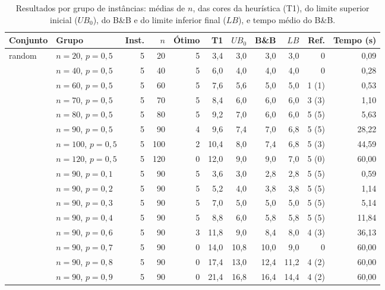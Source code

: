 \documentclass[12pt]{article}
\newcommand{\LB}{\mathit{LB}}
\newcommand{\UB}{\mathit{UB}}
\begin{document}
\begin{table}[ht]
  \centering
  \caption{Resultados por grupo de instâncias: médias de $n$, das cores da
    heurística (T1), do limite superior inicial ($\UB_0$), do B\&B e do
    limite inferior final ($\LB$), e tempo médio do B\&B.}
  \label{tab:grupos}
  \footnotesize\setlength{\tabcolsep}{3.5pt}
  \begin{tabular}{llrrrrrrrrr}
    \toprule
    Conjunto & Grupo & Inst. & $n$ & Ótimo & T1 & $\UB_0$ & B\&B & $\LB$ & Ref. & Tempo (s) \\
    \midrule
    random & $n=20$,  $p=0{,}5$ & 5 & 20  & 5 & 3,4  & 3,0  & 3,0  & 3,0  & 0     & 0,09 \\
           & $n=40$,  $p=0{,}5$ & 5 & 40  & 5 & 6,0  & 4,0  & 4,0  & 4,0  & 0     & 0,28 \\
           & $n=60$,  $p=0{,}5$ & 5 & 60  & 5 & 7,6  & 5,6  & 5,0  & 5,0  & 1 (1) & 0,53 \\
           & $n=70$,  $p=0{,}5$ & 5 & 70  & 5 & 8,4  & 6,0  & 6,0  & 6,0  & 3 (3) & 1,10 \\
           & $n=80$,  $p=0{,}5$ & 5 & 80  & 5 & 9,2  & 7,0  & 6,0  & 6,0  & 5 (5) & 5,63 \\
           & $n=90$,  $p=0{,}5$ & 5 & 90  & 4 & 9,6  & 7,4  & 7,0  & 6,8  & 5 (5) & 28,22 \\
           & $n=100$, $p=0{,}5$ & 5 & 100 & 2 & 10,4 & 8,0  & 7,4  & 6,8  & 5 (3) & 44,59 \\
           & $n=120$, $p=0{,}5$ & 5 & 120 & 0 & 12,0 & 9,0  & 9,0  & 7,0  & 5 (0) & 60,00 \\
           & $n=90$,  $p=0{,}1$ & 5 & 90  & 5 & 3,6  & 3,0  & 2,8  & 2,8  & 5 (5) & 0,59 \\
           & $n=90$,  $p=0{,}2$ & 5 & 90  & 5 & 5,2  & 4,0  & 3,8  & 3,8  & 5 (5) & 1,14 \\
           & $n=90$,  $p=0{,}3$ & 5 & 90  & 5 & 7,0  & 5,0  & 5,0  & 5,0  & 5 (5) & 5,14 \\
           & $n=90$,  $p=0{,}4$ & 5 & 90  & 5 & 8,8  & 6,0  & 5,8  & 5,8  & 5 (5) & 11,84 \\
           & $n=90$,  $p=0{,}6$ & 5 & 90  & 3 & 11,8 & 9,0  & 8,4  & 8,0  & 4 (3) & 36,13 \\
           & $n=90$,  $p=0{,}7$ & 5 & 90  & 0 & 14,0 & 10,8 & 10,0 & 9,0  & 0     & 60,00 \\
           & $n=90$,  $p=0{,}8$ & 5 & 90  & 0 & 17,4 & 13,0 & 12,4 & 11,2 & 4 (2) & 60,00 \\
           & $n=90$,  $p=0{,}9$ & 5 & 90  & 0 & 21,4 & 16,8 & 16,4 & 14,4 & 4 (2) & 60,00 \\

\end{tabular}
\end{table}
\end{document}
